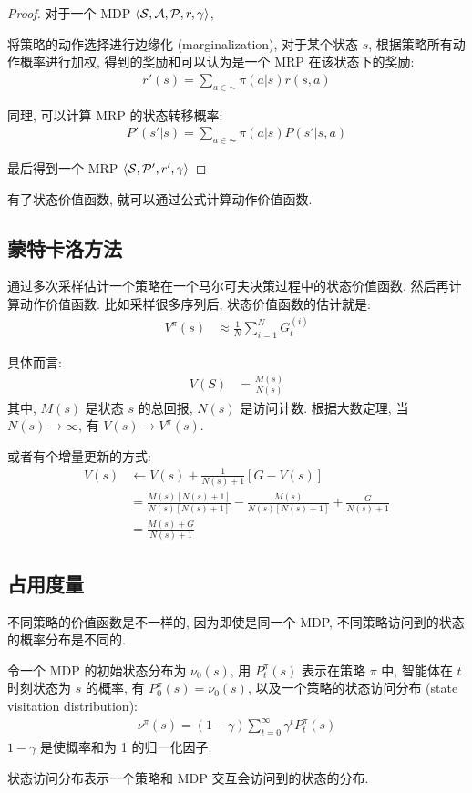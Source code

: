 \begin{proof}
    对于一个 MDP $\braket{\mathcal{S}, \mathcal{A}, \mathcal{P}, r,\gamma}$,

    将策略的动作选择进行边缘化 (marginalization), 对于某个状态 $s$, 根据策略所有动作概率进行加权, 得到的奖励和可以认为是一个 MRP 在该状态下的奖励:
    \begin{align*}
        r'(s) = \sum_{a\in\AC}\pi(a|s)r(s,a)
    \end{align*}

    同理, 可以计算 MRP 的状态转移概率:
    \begin{align*}
        P'(s'|s) = \sum_{a\in\AC}\pi(a|s)P(s'|s,a)
    \end{align*}

    最后得到一个 MRP $\braket{\mathcal{S}, \mathcal{P}', r',\gamma}$
\end{proof}

有了状态价值函数, 就可以通过公式计算动作价值函数. 

\subsection{蒙特卡洛方法}
通过多次采样估计一个策略在一个马尔可夫决策过程中的状态价值函数. 然后再计算动作价值函数. 比如采样很多序列后, 状态价值函数的估计就是:
\begin{align*}
    V^\pi(s) &\approx \frac{1}{N}\sum_{i=1}^N G_t^{(i)}
\end{align*}

具体而言:
\begin{align*}
    V(S)&=\frac{M(s)}{N(s)}
\end{align*}
其中, $M(s)$ 是状态 $s$ 的总回报, $N(s)$ 是访问计数. 根据大数定理, 当 $N(s)\to \infty$, 有 $V(s)\to V^\pi(s)$. 

或者有个增量更新的方式:
\begin{align*}
    V(s)&\leftarrow V(s) + \frac{1}{N(s)+1}[G-V(s)]\\
    &= \frac{M(s)[N(s)+1]}{N(s)[N(s)+1]} - \frac{M(s)}{N(s)[N(s)+1]} + \frac{G}{N(s)+1}\\
    &=\frac{M(s)+G}{N(s)+1}
\end{align*}

\subsection{占用度量}
不同策略的价值函数是不一样的, 因为即使是同一个 MDP, 不同策略访问到的状态的概率分布是不同的. 

\begin{definition}[状态访问分布]
    令一个 MDP 的初始状态分布为 $\nu_0(s)$, 用 $P_t^\pi(s)$ 表示在策略 $\pi$ 中, 智能体在 $t$ 时刻状态为 $s$ 的概率, 有 $P_0^\pi(s)=\nu_0(s)$, 以及一个策略的状态访问分布 (state visitation distribution):
    \begin{align*}
        \nu^\pi(s) = (1-\gamma)\sum_{t=0}^\infty \gamma^t P_t^\pi(s)
    \end{align*}
    $1-\gamma$ 是使概率和为 1 的归一化因子. 
    
    状态访问分布表示一个策略和 MDP 交互会访问到的状态的分布.
\end{definition}

